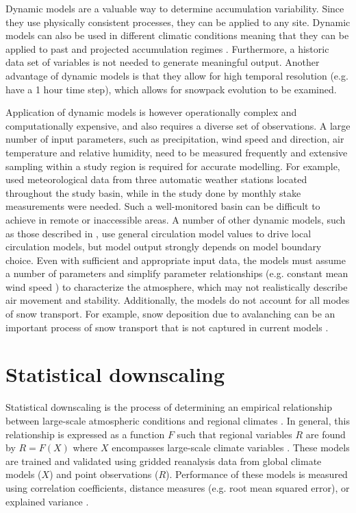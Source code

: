 \documentclass{sfuthesis}
\begin{document}
\begin{appendices}
Dynamic models are a valuable way to determine accumulation variability. Since they use physically consistent processes, they can be applied to any site. Dynamic models can also be used in different climatic conditions meaning that they can be applied to past and projected accumulation regimes \citep{Clark2011}. Furthermore, a historic data set of variables is not needed to generate meaningful output. Another advantage of dynamic models is that they allow for high temporal resolution (e.g. \cite{Mott2008} have a 1 hour time step), which allows for snowpack evolution to be examined.

Application of dynamic models is however operationally complex and computationally expensive, and also requires a diverse set of observations. A large number of input parameters, such as precipitation, wind speed and direction, air temperature and relative humidity, need to be measured frequently and extensive sampling within a study region is required for accurate modelling\citep{Liston2006}. For example, \cite{Dadic2010} used meteorological data from three automatic weather stations located throughout the study basin, while in the study done by \cite{Mott2008} monthly stake measurements were needed. Such a well-monitored basin can be difficult to achieve in remote or inaccessible areas. A number of other dynamic models, such as those described in \cite{Fowler2007}, use general circulation model values to drive local circulation models, but model output strongly depends on model boundary choice.  Even with sufficient and appropriate input data, the models must assume a number of parameters and simplify parameter relationships (e.g. constant mean wind speed \citep{Mott2008}) to characterize the atmosphere, which may not realistically describe air movement and stability. Additionally, the models do not account for all modes of snow transport. For example, snow deposition due to avalanching can be an important process of snow transport that is not captured in current models \citep{Mott2008}. 

\section{Statistical downscaling}

Statistical downscaling is the process of determining an empirical relationship between large-scale atmospheric conditions and regional climates \citep{Fowler2007}. In general, this relationship is expressed as a function $F$ such that regional variables $R$ are found by $R=F(X)$ where $X$ encompasses large-scale climate variables \citep{Fowler2007}. These models are trained and validated using gridded reanalysis data from global climate models ($X$) and point observations ($R$). Performance of these models is measured using correlation coefficients, distance measures (e.g. root mean squared error), or explained variance \citep{Fowler2007}. 


\end{appendices}
\end{document}
